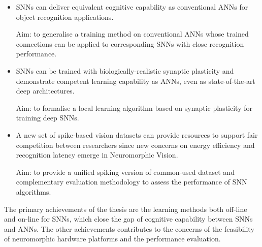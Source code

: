 \begin{itemize}
	
	\item 
	SNNs can deliver equivalent cognitive capability as conventional ANNs for object recognition applications.
	
	Aim: to generalise a training method on conventional ANNs whose trained connections can be applied to corresponding SNNs with close recognition performance.
	
	\item 
	SNNs can be trained with biologically-realistic synaptic plasticity and demonstrate competent learning capability as ANNs, even as state-of-the-art deep architectures.
	
	Aim: to formalise a local learning algorithm based on synaptic plasticity for training deep SNNs.
	
	\item 
	A new set of spike-based vision datasets can provide resources to support fair competition between researchers since new concerns on energy efficiency and recognition latency emerge in Neuromorphic Vision.
	
	Aim: to provide a unified spiking version of common-used dataset and complementary evaluation methodology to assess the performance of SNN algorithms.
\end{itemize}















The primary achievements of the thesis are the learning methods both off-line and on-line for SNNs, which close the gap of cognitive capability between SNNs and ANNs.
The other achievements contributes to the concerns of the feasibility of neuromorphic hardware platforms and the performance evaluation.



